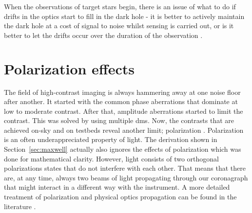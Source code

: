 \documentclass[letterpaper]{ar-1col}
\begin{document}
When the observations of target stars begin, there is an issue of what to do if drifts in the optics start to fill in the dark hole - it is better to actively maintain the dark hole at a cost of signal to noise whilst sensing is carried out, or is it better to let the drifts occur over the duration of the observation \citep{Pogorelyuk19,Redmond20}.

\section{Polarization effects} 

The field of high-contrast imaging is always hammering away at one noise floor after another.
%
It started with the common phase aberrations that dominate at low to moderate contrast.
%
After that, amplitude aberrations started to limit the contrast. This was solved by using multiple \acp{dm}.
%
Now, the contrasts that are achieved on-sky and on testbeds reveal another limit; polarization \citep{Schmid18,millar2022polarization,vanHolstein23, baudoz2024polarization}.
%
Polarization is an often underappreciated property of light.
%
The derivation shown in Section~\ref{sec:maxwell} actually also ignores the effects of polarization which was done for mathematical clarity.
%
However, light consists of two orthogonal polarizations states that do not interfere with each other.
%
That means that there are, at any time, always two beams of light propagating through our coronagraph that might interact in a different way with the instrument.
%
A more detailed treatment of polarization and physical optics propagation can be found in the literature \citep{McLeod14}.
\end{document}
